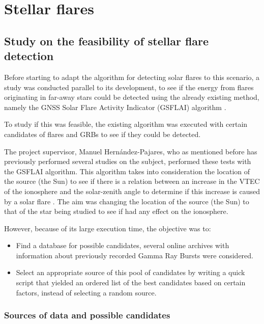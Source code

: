 \chapter{Stellar flares}

\section{Study on the feasibility of stellar flare detection}

Before starting to adapt the algorithm for detecting solar flares to this scenario, a study was conducted parallel to its development, to see if the energy from flares originating in far-away stars could be detected using the already existing method, namely the GNSS Solar Flare Activity Indicator (GSFLAI) algorithm \cite{hernandez2012gnss}.

To study if this was feasible, the existing algorithm was executed with certain candidates of flares and GRBs to see if they could be detected.

The project supervisor, Manuel Hernández-Pajares, who as mentioned before has previously performed several studies on the subject, performed these tests with the GSFLAI algorithm. This algorithm takes into consideration the location of the source (the Sun) to see if there is a relation between an increase in the VTEC of the ionosphere and the solar-zenith angle to determine if this increase is caused by a solar flare \cite{hernandez2012gnss}. The aim was changing the location of the source (the Sun) to that of the star being studied to see if had any effect on the ionosphere.

However, because of its large execution time, the objective was to:

\begin{itemize}
	\item Find a database for possible candidates, several online archives with information about previously recorded Gamma Ray Bursts were considered.
	\item Select an appropriate source of this pool of candidates by writing a quick script that yielded an ordered list of the best candidates based on certain factors, instead of selecting a random source.
\end{itemize}

\subsection{Sources of data and possible candidates}

